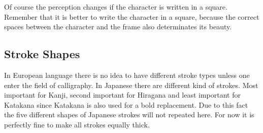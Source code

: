 \bigskip

Of course the perception changes if the character is written in a square.
Remember that it is better to write the character in a square, because the
correct spaces between the character and the frame also determinates its
beauty.

\bigskip


\bigskip

\subsection{Stroke Shapes}

In European language there is no idea to have different stroke types unless one
enter the field of calligraphy. In Japanese there are different kind of
strokes.  Most important for Kanji, second important for Hiragana and least
important for Katakana since Katakana is also used for a bold replacement.  Due
to this fact the five different shapes of Japanese strokes will not repeated
here. For now it is perfectly fine to make all strokes equally thick. 


